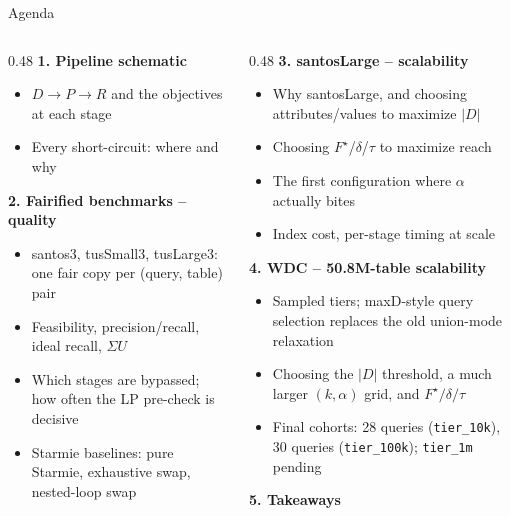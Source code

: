 \documentclass[aspectratio=169,10pt]{beamer}
\begin{document}
\begin{frame}{Agenda}
\begin{columns}[T]
\begin{column}{0.48\textwidth}
\textbf{\color{Cat1}1. Pipeline schematic}
\begin{itemize}\small
  \item $D \to P \to R$ and the objectives at each stage
  \item Every short-circuit: where and why
\end{itemize}
\vspace{6pt}
\textbf{\color{Cat3}2. Fairified benchmarks -- quality}
\begin{itemize}\small
  \item santos3, tusSmall3, tusLarge3: one fair copy per (query, table) pair
  \item Feasibility, precision/recall, ideal recall, $\Sigma U$
  \item Which stages are bypassed; how often the LP pre-check is decisive
  \item Starmie baselines: pure Starmie, exhaustive swap, nested-loop swap
\end{itemize}
\end{column}
\begin{column}{0.48\textwidth}
\textbf{\color{Cat2}3. santosLarge -- scalability}
\begin{itemize}\small
  \item Why santosLarge, and choosing attributes/values to maximize $|D|$
  \item Choosing $F^\star$/$\delta$/$\tau$ to maximize reach
  \item The first configuration where $\alpha$ actually bites
  \item Index cost, per-stage timing at scale
\end{itemize}
\vspace{6pt}
\textbf{\color{Cat4}4. WDC -- 50.8M-table scalability}
\begin{itemize}\small
  \item Sampled tiers; maxD-style query selection replaces the old union-mode relaxation
  \item Choosing the $|D|$ threshold, a much larger $(k,\alpha)$ grid, and $F^\star/\delta/\tau$
  \item Final cohorts: 28 queries (\texttt{tier\_10k}), 30 queries (\texttt{tier\_100k}); \texttt{tier\_1m} pending
\end{itemize}
\vspace{6pt}
\textbf{\color{Ink}5. Takeaways}
\end{column}
\end{columns}
\end{frame}
\end{document}
